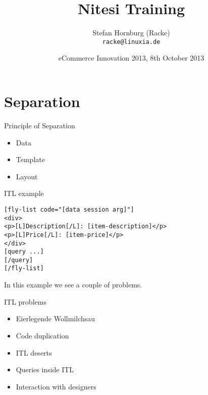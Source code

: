 \usepackage[utf8]{inputenc}
\usepackage[T1]{fontenc}
\usepackage{mathptmx}
\usepackage[scaled=.90]{helvet}
\usepackage{courier}
\usepackage{caption}
\captionsetup{labelformat=empty,labelsep=none}
\usepackage{beamerthemesplit}
\usepackage{verbatim}
\usepackage{hyperref}
\usepackage{listings}
\lstset{language=Perl,basicstyle=\normalsize,tabsize=3,showstringspaces=false}

\title{Nitesi Training}
\author[racke]{Stefan Hornburg (Racke)\\ \texttt{racke@linuxia.de}}
\date{eCommerce Innovation 2013, 8th October 2013}


\maketitle{}

\begin{frame}
  \titlepage
\end{frame}

\tableofcontents

\section{Separation}
\begin{frame}{Principle of Separation}
\begin{itemize}
\item Data
\item Template
\item Layout
\end{itemize}
\end{frame}

\begin{frame}[fragile]{ITL example}
\begin{lstlisting}
[fly-list code="[data session arg]"]
<div>
<p>[L]Description[/L]: [item-description]</p>
<p>[L]Price[/L]: [item-price]</p>
</div>
[query ...]
[/query]
[/fly-list]
\end{lstlisting}
\end{frame}

In this example we see a couple of problems.

\begin{frame}{ITL problems}
\begin{itemize}
\item Eierlegende Wollmilchsau
\item Code duplication
\item ITL deserts
\item Queries inside ITL
\item Interaction with designers
\end{itemize}
\end{frame}

